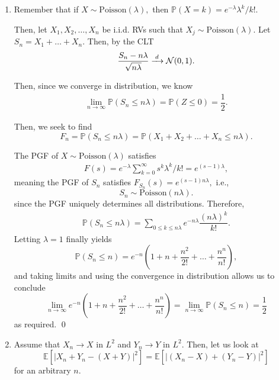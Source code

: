 \documentclass[12pt]{article}
\begin{document}
\begin{enumerate}
\begin{enumerate}
        Since $$e^{x} = \lim_{n \to \infty} \left(1 + \dfrac{x}{n}\right)^{n},$$ we conclude that in the limit,
        $$
        \lim_{n \to \infty} \mathbb P(U_n \leq x) = 1- e^{-x}
        $$
        as required. \qed
    \end{enumerate}

  \item Remember that if $X \sim \text{Poisson}(\lambda),$ then $\mathbb P(X = k) = e^{-\lambda}\lambda^{k}/k!.$

    Then, let $X_1, X_2, \ldots, X_n$ be i.i.d. RVs such that $X_j \sim \text{Poisson}(\lambda).$ Let $S_n = X_1 + \ldots + X_n.$ Then, by the CLT
    \begin{align*}
      \dfrac{S_n - n\lambda}{\sqrt{n\lambda}} \xrightarrow{\;d\;} \mathcal N(0, 1).
    \end{align*}

    Then, since we converge in distribution, we know
    \begin{align*}
      \lim_{n \to \infty} \mathbb P(S_n \leq n \lambda ) = \mathbb P(Z \leq 0) = \dfrac{1}{2}.
    \end{align*}

    Then, we seek to find $$
    F_n= \mathbb P(S_n \leq n \lambda) = \mathbb P(X_1 + X_2 + \ldots + X_n \leq n \lambda).
    $$

    The PGF of $X \sim \text{Poisson}(\lambda)$ satisfies
    \begin{align*}
      F(s) =e^{-\lambda}\sum_{k = 0}^{\infty} s^k \lambda^k / k! = e^{(s - 1)\lambda},
    \end{align*}
    meaning the PGF of $S_n$ satisfies $F_{S_n}(s) = e^{(s-1)n\lambda},$ i.e., $$
    S_n \sim \text{Poisson}(n\lambda).
    $$
    since the PGF uniquely determines all distributions. Therefore,
    \begin{align*}
      \mathbb P(S_n \leq n\lambda) = \sum_{0 \leq k \leq n\lambda} e^{-n\lambda} \dfrac{(n\lambda)^k}{k!}.
    \end{align*}
    Letting $\lambda = 1$ finally yields $$
    \mathbb P(S_n \leq n) = e^{-n} \left(1 + n + \dfrac{n^2}{2!} + \ldots + \dfrac{n^n}{n!}\right),
    $$
    and taking limits and using the convergence in distribution allows us to conclude $$
    \lim_{n \to \infty} e^{-n} \left(1 + n + \dfrac{n^2}{2!} + \ldots + \dfrac{n^n}{n!}\right) = \lim_{n \to \infty} \mathbb P(S_n \leq n) = \dfrac{1}{2}
    $$
    as required. \qed

  \item Assume that $X_n \to X$ in $L^2$ and $Y_n \to Y$ in $L^2.$ Then, let us look at $$
    \mathbb E[|X_n + Y_n - (X + Y)|^2] = \mathbb E[|(X_n - X) + (Y_n - Y)|^2]
    $$
    for an arbitrary $n.$


\end{enumerate}
\end{document}
